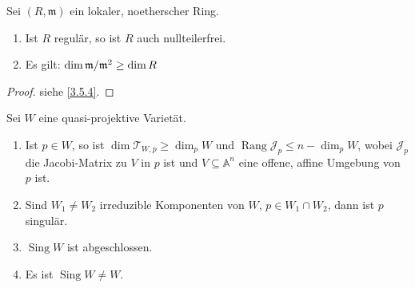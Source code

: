 \documentclass[a4paper,12pt,index=toc]{scrbook}
\theoremstyle{keinenummern} %
\def\A{\mathbb{A}}
\newcommand{\J}{\mathcal{J}}
\def\T{\mathcal{T}}
\def\m{\mathfrak{m}}
\newcommand{\Rang}{\operatorname{Rang}}
\newcommand{\Sing}{\operatorname{Sing}}
\begin{document}
\begin{lem}\label{3.4.3} Sei $(R,\m)$ ein lokaler, noetherscher Ring.
  \begin{enumerate}
  \item{} Ist $R$ regulär, so ist $R$ auch nullteilerfrei.
  \item{} Es gilt: $\dim \Quotient{\m}{\m^2} \ge \dim R$
  \end{enumerate}
\end{lem}
\begin{proof}siehe \cref{3.5.4}.
\end{proof}

\begin{satz}\label{satz6} Sei $W$ eine quasi-projektive Varietät.
  \begin{enumerate}
   \item\label{satz6a} Ist $p\in W$, so ist $\dim \T_{W,p} \ge \dim_p W$ und $\Rang \J_p \le n-\dim_p W$, wobei $\J_p$ die Jacobi-Matrix zu $V$ in $p$ ist und $V\subseteq \A^n$ eine offene, affine Umgebung von $p$ ist.
  \item\label{satz6b} Sind $W_1\neq W_2$ irreduzible Komponenten von $W$, $p\in W_1\cap W_2$, dann ist $p$ singulär.
   \item\label{satz6c} $\Sing W$ ist abgeschlossen.
   \item\label{satz6d} Es ist $\Sing W\neq W$.
  \end{enumerate}
\end{satz}
\end{document}
